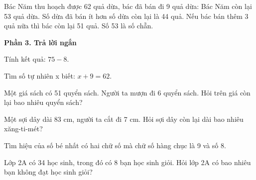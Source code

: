 \begin{ex} %
Bác Năm thu hoạch được 62 quả dừa, bác đã bán đi 9 quả dừa:
\choiceTF
{\True Bác Năm còn lại 53 quả dừa.}
{\True Số dừa đã bán ít hơn số dừa còn lại là 44 quả.}
{Nếu bác bán thêm 3 quả nữa thì bác còn lại 51 quả.}
{Số 53 là số chẵn.}
\end{ex}

\textbf{Phần 3. Trả lời ngắn}

\begin{ex} %
Tính kết quả: $75 - 8$.
\end{ex}

\begin{ex} %
Tìm số tự nhiên x biết: $x + 9 = 62$.
\end{ex}

\begin{ex} %
Một giá sách có 51 quyển sách. Người ta mượn đi 6 quyển sách. Hỏi trên giá còn lại bao nhiêu quyển sách?
\end{ex}

\begin{ex} %
Một sợi dây dài 83 cm, người ta cắt đi 7 cm. Hỏi sợi dây còn lại dài bao nhiêu xăng-ti-mét?
\end{ex}

\begin{ex} %
Tìm hiệu của số bé nhất có hai chữ số mà chữ số hàng chục là 9 và số 8.
\end{ex}

\begin{ex} %
Lớp 2A có 34 học sinh, trong đó có 8 bạn học sinh giỏi. Hỏi lớp 2A có bao nhiêu bạn không đạt học sinh giỏi?
\end{ex}
